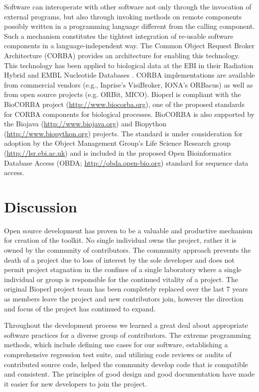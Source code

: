 \documentclass[12pt]{article}
\begin{document}
Software can interoperate with other software not only through the
invocation of external programs, but also through invoking methods on
remote components possibly written in a programming language different
from the calling component.  Such a mechanism constitutes the tightest
integration of re-usable software components in a language-independent
way.  The Common Object Request Broker Architecture (CORBA)
\cite{corba} provides an architecture for enabling this technology.
This technology has been applied to biological data at the EBI in
their Radiation Hybrid \cite{rhdb} and EMBL Nucleotide Databases
\cite{embl-corba}.  CORBA implementations are available from
commercial vendors (e.g., Inprise's VisiBroker, IONA's ORBacus) as
well as from open source projects (e.g. ORBit, MICO).  Bioperl is
compliant with the BioCORBA project (\url{http://www.biocorba.org}),
one of the proposed standards for CORBA components for biological
processes.  BioCORBA is also supported by the Biojava
(\url{http://www.biojava.org}) and Biopython
(\url{http://www.biopython.org}) projects.  The standard is under
consideration for adoption by the Object Management Group's Life
Science Research group (\url{http://lsr.ebi.ac.uk}) and is included in
the proposed Open Bioinformatics Database Access (OBDA;
\url{http://obda.open-bio.org}) standard for sequence data access.

\section{Discussion}

Open source development has proven to be a valuable and productive
mechanism for creation of the toolkit.  No single individual owns the
project, rather it is owned by the community of contributors.  The
community approach prevents the death of a project due to loss of
interest by the sole developer and does not permit project stagnation
in the confines of a single laboratory where a single individual or
group is responsible for the continued vitality of a project.  The
original Bioperl project team has been completely replaced over the
last 7 years as members leave the project and new contributors join,
however the direction and focus of the project has continued to expand.

Throughout the development process we learned a great deal about
appropriate software practices for a diverse group of contributors.
The extreme programming methods, which include defining use cases for
our software, establishing a comprehensive regression test suite, and
utilizing code reviews or audits of contributed source code, helped
the community develop code that is compatible and consistent.  The
principles of good design and good documentation have made it easier
for new developers to join the project.
\end{document}
